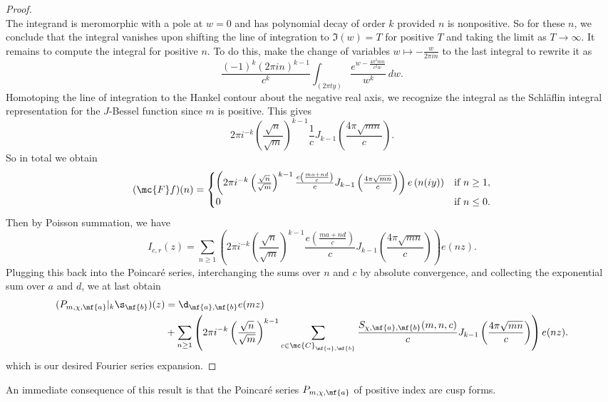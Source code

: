 \documentclass[12pt]{article}
\begin{document}
\begin{proof}
\[        \]
        The integrand is meromorphic with a pole at \(w = 0\) and has polynomial decay of order \(k\) provided \(n\) is nonpositive. So for these \(n\), we conclude that the integral vanishes upon shifting the line of integration to \(\Im(w) = T\) for positive \(T\) and taking the limit as \(T \to \infty\). It remains to compute the integral for positive \(n\). To do this, make the change of variables \(w \mapsto -\frac{w}{2\pi in}\) to the last integral to rewrite it as
        \[
          \frac{(-1)^{k}(2\pi in)^{k-1}}{c^{k}}\int_{(2\pi ty)}\frac{e^{w-\frac{4\pi^{2}mn}{c^{2}w}}}{w^{k}}\,dw.
        \]
        Homotoping the line of integration to the Hankel contour about the negative real axis, we recognize the integral as the Schl\"aflin integral representation for the \(J\)-Bessel function since \(m\) is positive. This gives
        \[
          2\pi i^{-k}\left(\frac{\sqrt{n}}{\sqrt{m}}\right)^{k-1}\frac{1}{c}J_{k-1}\left(\frac{4\pi\sqrt{mn}}{c}\right).
        \]
        So in total we obtain
        \[
          (\mc{F}f)(n) = \begin{cases} \left(2\pi i^{-k}\left(\frac{\sqrt{n}}{\sqrt{m}}\right)^{k-1}\frac{e\left(\frac{ma+nd}{c}\right)}{c}J_{k-1}\left(\frac{4\pi\sqrt{mn}}{c}\right)\right)e\left(n(iy)\right) & \text{if \(n \ge 1\)}, \\ 0 & \text{if \(n \le 0\)}. \end{cases}
        \]
        Then by Poisson summation, we have
        \[
          I_{c,r}(z) = \sum_{n \ge 1}\left(2\pi i^{-k}\left(\frac{\sqrt{n}}{\sqrt{m}}\right)^{k-1}\frac{e\left(\frac{ma+nd}{c}\right)}{c}J_{k-1}\left(\frac{4\pi\sqrt{mn}}{c}\right)\right)e(nz).
        \]
        Plugging this back into the Poincar\'e series, interchanging the sums over \(n\) and \(c\) by absolute convergence, and collecting the exponential sum over \(a\) and \(d\), we at last obtain
        \begin{align*}
          (P_{m,\chi,\mf{a}}|_{k}\s_{\mf{b}})(z) &= \d_{\mf{a},\mf{b}}e(mz) \\
          &+ \sum_{n \ge 1}\left(2\pi i^{-k}\left(\frac{\sqrt{n}}{\sqrt{m}}\right)^{k-1}\sum_{\substack{c \in \mc{C}_{\mf{a},\mf{b}}}}\frac{S_{\chi,\mf{a},\mf{b}}(m,n,c)}{c}J_{k-1}\left(\frac{4\pi\sqrt{mn}}{c}\right)\right)e(nz).
        \end{align*}
        which is our desired Fourier series expansion.
      \end{proof}
      
      An immediate consequence of this result is that the Poincar\'e series \(P_{m,\chi,\mf{a}}\) of positive index are cusp forms.
      
\end{document}
